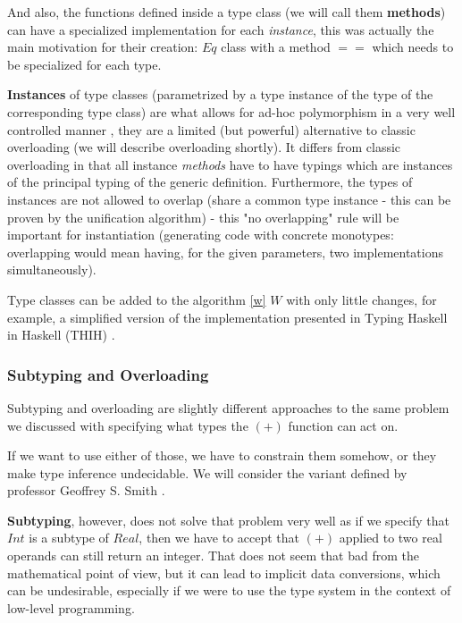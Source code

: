 And also, the functions defined inside a type class (we will call them \textbf{methods}) can have a specialized implementation for each \emph{instance}, this was actually the main motivation for their creation: $Eq$ class with a method $==$ which needs to be specialized for each type. \cite{hall1994type}

\textbf{Instances} of type classes (parametrized by a type instance of the type of the corresponding type class) are what allows for ad-hoc polymorphism in a very well controlled manner \cite{wadler1989make}, they are a limited (but powerful) alternative to classic overloading (we will describe overloading shortly). It differs from classic overloading in that all instance \emph{methods} have to have typings which are instances of the principal typing of the generic definition. Furthermore, the types of instances are not allowed to overlap (share a common type instance - this can be proven by the unification algorithm) - this "no overlapping" rule will be important for instantiation (generating code with concrete monotypes: overlapping would mean having, for the given parameters, two implementations simultaneously).

Type classes can be added to the algorithm \ref{w} $W$ with only little changes, for example, a simplified version of the implementation presented in Typing Haskell in Haskell (THIH) \cite{jones1999typing}.

\subsubsection{Subtyping and Overloading}

Subtyping and overloading are slightly different approaches to the same problem we discussed with specifying what types the $(+)$ function can act on.

If we want to use either of those, we have to constrain them somehow, or they make type inference undecidable. We will consider the variant defined by professor Geoffrey S. Smith \cite{smith1993polymorphic}.

\textbf{Subtyping}, however, does not solve that problem very well as if we specify that $Int$ is a subtype of $Real$, then we have to accept that $(+)$ applied to two real operands can still return an integer. That does not seem that bad from the mathematical point of view, but it can lead to implicit data conversions, which can be undesirable, especially if we were to use the type system in the context of low-level programming.

